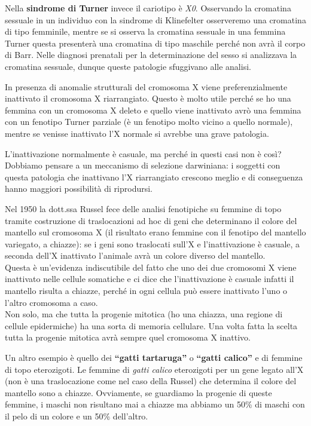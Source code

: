 \documentclass[11pt]{book}
\begin{document}
Nella \textbf{sindrome di Turner} invece il cariotipo è \emph{X0}. Osservando la cromatina sessuale in un individuo con la sindrome di Klinefelter osserveremo una cromatina di tipo femminile, mentre se si osserva la cromatina sessuale in una femmina Turner questa presenterà una cromatina di tipo maschile perché non avrà il corpo di Barr. Nelle diagnosi prenatali per la determinazione del sesso si analizzava la cromatina sessuale, dunque queste patologie sfuggivano alle analisi.

In presenza di anomalie strutturali del cromosoma X viene preferenzialmente inattivato il cromosoma X riarrangiato. 
Questo è molto utile perché se ho una femmina con un cromosoma X deleto e quello viene inattivato avrò una femmina con un fenotipo Turner parziale (è un fenotipo molto vicino a quello normale), mentre se venisse inattivato l’X normale si avrebbe una grave patologia.

L’inattivazione normalmente è casuale, ma perché in questi casi non è così? Dobbiamo pensare a un meccanismo di selezione darwiniana: i soggetti con questa patologia che inattivano l’X riarrangiato crescono meglio e di conseguenza hanno maggiori possibilità di riprodursi.

Nel 1950 la dott.ssa Russel fece delle analisi fenotipiche su femmine di topo tramite costruzione di traslocazioni ad hoc di geni che determinano il colore del mantello sul cromosoma X (il risultato erano femmine con il fenotipo del mantello variegato, a chiazze): se i geni sono traslocati sull’X e l’inattivazione è casuale, a seconda dell’X inattivato l’animale avrà un colore diverso del mantello.\\
Questa è un’evidenza indiscutibile del fatto che uno dei due cromosomi X viene inattivato nelle cellule somatiche e ci dice che l’inattivazione è casuale infatti il mantello risulta a chiazze, perché in ogni cellula può essere inattivato l’uno o l’altro cromosoma a caso.\\
Non solo, ma che tutta la progenie mitotica (ho una chiazza, una regione di cellule epidermiche) ha una sorta di memoria cellulare. Una volta fatta la scelta tutta la progenie mitotica avrà sempre quel cromosoma X inattivo.

Un altro esempio è quello dei \textbf{``gatti tartaruga''} o \textbf{``gatti calico''} e di femmine di topo eterozigoti. Le femmine di \emph{gatti calico} eterozigoti per un gene legato all’X (non è una traslocazione come nel caso della Russel) che determina il colore del mantello sono a chiazze. Ovviamente, se guardiamo la progenie di queste femmine, i maschi non risultano mai a chiazze ma abbiamo un 50\% di maschi con il pelo di un colore e un 50\% dell’altro.
\end{document}
